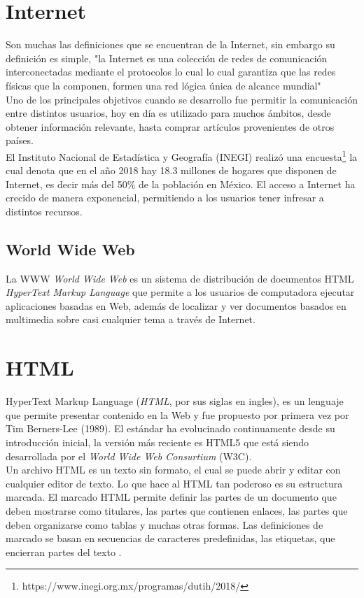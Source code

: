 \section{Internet}
Son muchas las definiciones que se encuentran de la Internet, sin embargo su definición es simple, 
"la Internet es una colección de redes de comunicación interconectadas mediante el protocolos 
lo cual lo cual garantiza que las redes físicas que la componen, formen una red lógica única de 
alcance mundial" %
\\
Uno de los principales objetivos cuando se desarrollo fue permitir la comunicación entre distintos usuarios,
hoy en día es utilizado para muchos ámbitos, desde obtener información relevante, hasta comprar artículos 
provenientes de otros países.
\\
El Instituto Nacional de Estadística y Geografía (INEGI) realizó una encuesta\footnote{https://www.inegi.org.mx/programas/dutih/2018/}  
la cual denota que en el año 2018 hay 18.3 millones de hogares que disponen de Internet, es decir más del 
50\% de la población en México.
El acceso a Internet ha crecido de manera exponencial, permitiendo a los usuarios tener infresar a distintos recursos.


\subsection{World Wide Web}
La WWW \textit{World Wide Web} es un sistema de distribución de documentos HTML \textit{HyperText Markup Language} 
que permite a los usuarios de computadora ejecutar aplicaciones basadas en Web, además de localizar y ver documentos 
basados en multimedia sobre casi cualquier tema a través de Internet.

\section{HTML}
HyperText Markup Language (\textit{HTML}, por sus siglas en ingles), 
es un lenguaje que permite presentar contenido en la Web y fue propuesto por primera vez por 
Tim Berners-Lee (1989). El estándar ha evolucinado continuamente desde su introducción inicial, 
la versión más reciente es HTML5 que está siendo desarrollada por el \textit{World Wide Web Consurtium} (W3C).
\\
Un archivo HTML es un texto sin formato, el cual se puede abrir y editar con cualquier editor de 
texto. Lo que hace al HTML tan poderoso es su estructura marcada. El marcado HTML permite definir las partes 
de un documento que deben mostrarse como titulares, las partes que contienen enlaces, las partes que deben 
organizarse como tablas y muchas otras formas. Las definiciones de marcado se basan en secuencias de caracteres 
predefinidas, las etiquetas, que encierran partes del texto \citep{CTHTML}.

